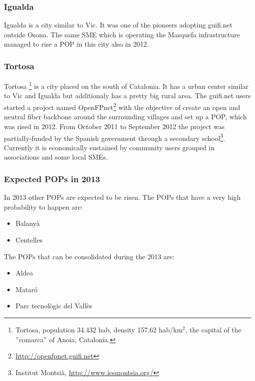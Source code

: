 \FloatBarrier
\subsubsection{Igualda}

Igualda is a city similar to Vic. It was one of the pioneers adopting guifi.net outside Osona. The same SME which is operating the Masquefa infrastructure managed to rise a POP in this city also in 2012.


\FloatBarrier
\subsubsection{Tortosa}
Tortosa \footnote{Tortosa, population 34.432 hab, density 157,62 hab/km$^{2}$, the capital of the ''comarca'' of Anoia, Catalonia.} is a city placed on the south of Catalonia. It has a urban center similar to Vic and Igualda but additionaly has a pretty big rural area. The guifi.net users started a project named  OpenFPnet\footnote{\url{http://openfpnet.guifi.net}} with the objective of create an open and neutral fiber backbone around the surrounding villages and set up a POP, which was rised in 2012. From October 2011 to September 2012 the project was partially-funded by the Spanish government through a secondary school\footnote{Institut Montsià, \url{http://www.iesmontsia.org/}}. Currently it is economically sustained by community users grouped in associations and some local SMEs.



\FloatBarrier
\subsubsection{Expected POPs in 2013}

In 2013 other POPs are expected to be risen. The POPs that have a very high probability to happen are:

\begin{itemize}
  \item Balany\`{a}
  \item Centelles
\end{itemize} 

The POPs that can be consolidated during the 2013 are:

\begin{itemize}
  \item Aldea
  \item Matar\'{o}
  \item Parc tecnol\`{o}gic del Vall\`{e}s
\end{itemize} 
